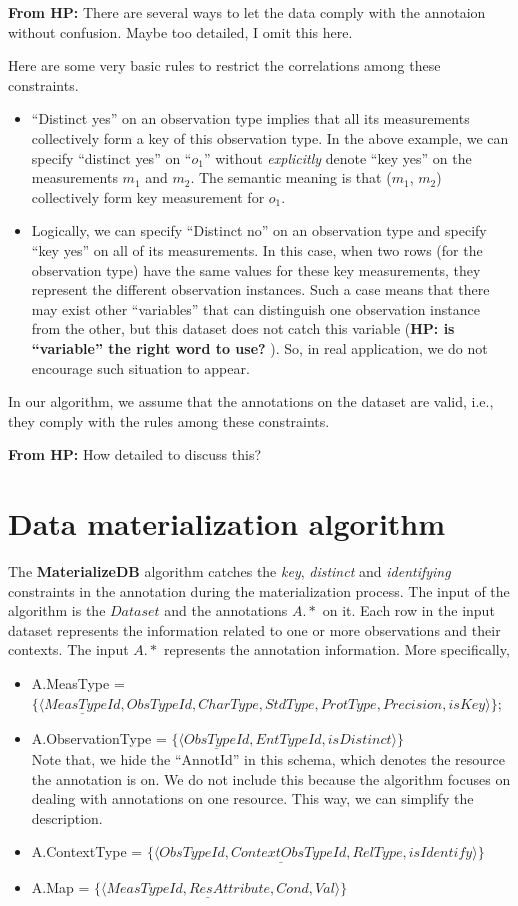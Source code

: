 \documentclass[10pt]{article}
\begin{document}
{\bf From HP:}  There are several ways to let the data comply with the annotaion without confusion. 
Maybe too detailed, I omit this here. 

Here are some very basic rules to restrict the correlations among these constraints. 
\begin{itemize}
\item ``Distinct yes'' on an observation type implies that all its measurements collectively form a key of this observation type. 
In the above example, we can specify ``distinct yes'' on ``$o_1$'' without {\em explicitly} denote ``key yes'' on the measurements $m_1$ and $m_2$. 
The semantic meaning is that ($m_1$, $m_2$) collectively form key measurement for $o_1$.  
\item Logically, we can specify ``Distinct no'' on an observation type and specify ``key yes'' on all of its measurements.
In this case, when two rows (for the observation type) have the same values for these key measurements, they represent the different observation instances. Such a case means that there may exist other ``variables'' that can distinguish one observation instance from the other, but this dataset does not catch this variable ({\bf HP: is ``variable'' the right word to use? }). So, in real application, we do not encourage such situation to appear. 
\end{itemize}


In our algorithm, we assume that the annotations on the dataset are valid, i.e., they comply with the rules among these constraints. 

{\bf From HP:} How detailed to discuss this? 

\section{Data materialization algorithm}
The {\bf MaterializeDB} algorithm catches the {\em key}, {\em distinct} and {\em identifying} constraints in the annotation during the materialization process. 
The input of the algorithm is the $Dataset$ and the annotations $A.*$ on it. 
Each row in the input dataset represents the information related to one or more observations and their contexts.
The input $A.*$ represents the annotation information.
More specifically,
\begin{itemize}
\item A.MeasType = $\{\langle \underline{MeasTypeId}, ObsTypeId, CharType, StdType, ProtType, Precision, isKey \rangle\}$;
\item A.ObservationType = $\{\langle \underline{ObsTypeId}, EntTypeId, isDistinct \rangle\}$ \\
	Note that, we hide the ``AnnotId'' in this schema, which denotes the resource the annotation is on.
    We do not include this because the algorithm focuses on dealing with annotations on one resource.
    This way, we can simplify the description.
\item A.ContextType = $\{\langle \underline{ObsTypeId, ContextObsTypeId, RelType}, isIdentify\rangle\}$
\item A.Map = $\{\langle \underline{MeasTypeId, ResAttribute, Cond}, Val\rangle\}$
\end{itemize}
\end{document}
